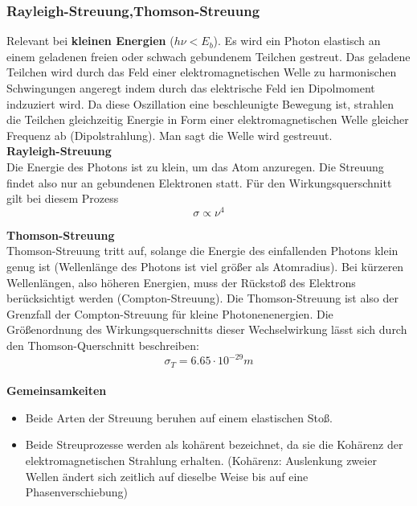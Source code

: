 \documentclass[Ex4_Zusammenfassung.tex]{subfiles}
\begin{document}
\subsubsection{Rayleigh-Streuung,Thomson-Streuung}
Relevant bei \textbf{kleinen Energien} ($h \nu < E_b $). \newline
Es wird ein Photon elastisch an einem geladenen freien oder schwach gebundenem Teilchen gestreut. Das geladene Teilchen wird durch das Feld einer elektromagnetischen Welle zu harmonischen Schwingungen angeregt indem durch das elektrische Feld ien Dipolmoment indzuziert wird. Da diese Oszillation eine beschleunigte Bewegung ist, strahlen die Teilchen gleichzeitig Energie in Form einer elektromagnetischen Welle gleicher Frequenz ab (Dipolstrahlung). Man sagt die Welle wird gestreuut. \\ \newline
\textbf{Rayleigh-Streuung} \\ \newline 
 Die Energie des Photons ist zu klein, um das Atom anzuregen. Die Streuung findet also nur an gebundenen Elektronen statt. Für den Wirkungsquerschnitt gilt bei diesem Prozess
\begin{equation}
\sigma \propto \nu^4
\end{equation}

\textbf{Thomson-Streuung} \\ \newline
Thomson-Streuung tritt auf, solange die Energie des einfallenden Photons klein genug ist (Wellenlänge des Photons ist viel größer als Atomradius). Bei kürzeren Wellenlängen, also höheren Energien, muss der Rückstoß des Elektrons berücksichtigt werden (Compton-Streuung). Die Thomson-Streuung ist also der Grenzfall der Compton-Streuung für kleine Photonenenergien.  Die Größenordnung des Wirkungsquerschnitts dieser Wechselwirkung lässt sich durch den Thomson-Querschnitt beschreiben:
\begin{equation}
\sigma_{T} = 6.65 \cdot 10^{-29}  m 
\end{equation} \\ \newline
\textbf{Gemeinsamkeiten}

\begin{itemize}
\item Beide Arten der Streuung beruhen auf einem elastischen Stoß.
\item Beide Streuprozesse werden als kohärent bezeichnet, da sie die Kohärenz der elektromagnetischen Strahlung erhalten. \newline  (Kohärenz: Auslenkung zweier Wellen ändert sich zeitlich auf dieselbe Weise bis auf eine Phasenverschiebung)
\end{itemize}
\end{document}
